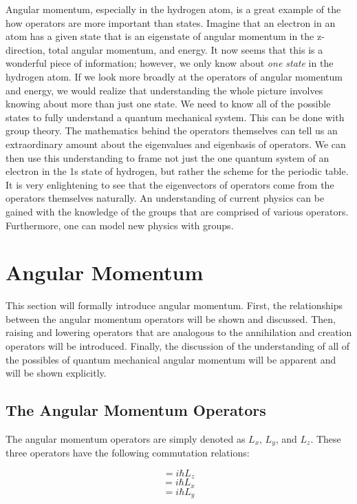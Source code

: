 \documentclass{article}
\begin{document}
Angular momentum, especially in the hydrogen atom, is a great example of the how operators are more important than states. Imagine that an electron in an atom has a given state that is an eigenstate of angular momentum in the z-direction, total angular momentum, and energy. It now seems that this is a wonderful piece of information; however, we only know about \textit{one state} in the hydrogen atom. If we look more broadly at the operators of angular momentum and energy, we would realize that understanding the whole picture involves knowing about more than just one state. We need to know all of the possible states to fully understand a quantum mechanical system. This can be done with group theory. The mathematics behind the operators themselves can tell us an extraordinary amount about the eigenvalues and eigenbasis of operators. We can then use this understanding to frame not just the one quantum system of an electron in the 1s state of hydrogen, but rather the scheme for the periodic table. It is very enlightening to see that the eigenvectors of operators come from the operators themselves naturally. An understanding of current physics can be gained with the knowledge of the groups that are comprised of various operators. Furthermore, one can model new physics with groups.


\section{Angular Momentum}
This section will formally introduce angular momentum. First, the relationships between the angular momentum operators will be shown and discussed. Then, raising and lowering operators that are analogous to the annihilation and creation operators will be introduced. Finally, the discussion of the understanding of all of the possibles of quantum mechanical angular momentum will be apparent and will be shown explicitly.

\subsection{The Angular Momentum Operators}
The angular momentum operators are simply denoted as $L_x$, $L_y$, and $L_z$. These three operators have the following commutation relations:

\begin{equation}
[L_x, L_y] = i\hbar L_z
\end{equation}
\begin{equation}
[L_y, L_z] = i\hbar L_x
\end{equation}
\begin{equation}
[L_z, L_x] = i\hbar L_y
\end{equation}
\end{document}
